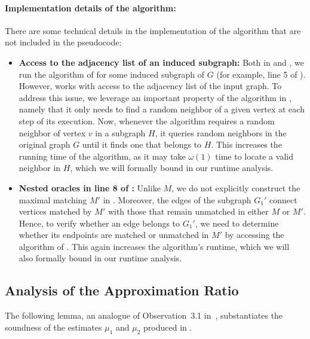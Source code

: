 \documentclass[letterpaper,11pt]{article}
\begin{document}
\paragraph{Implementation details of the algorithm:} There are some technical details in the implementation of the algorithm that are not included in the pseudocode:

\begin{itemize}
    \item \textbf{Access to the adjacency list of an induced subgraph:} Both in  and , we run the algorithm of  for some induced subgraph of $G$ (for example, line 5 of ). However,  works with access to the adjacency list of the input graph. To address this issue, we leverage an important property of the algorithm in , namely that it only needs to find a random neighbor of a given vertex at each step of its execution. Now, whenever the algorithm requires a random neighbor of vertex $v$ in a subgraph $H$, it queries random neighbors in the original graph $G$ until it finds one that belongs to $H$. This increases the running time of the algorithm, as it may take $\omega(1)$ time to locate a valid neighbor in $H$, which we will formally bound in our runtime analysis.

    \item \textbf{Nested oracles in line 8 of :} Unlike $M$, we do not explicitly construct the maximal matching $M'$ in . Moreover, the edges of the subgraph $G_1'$ connect vertices matched by $M'$ with those that remain unmatched in either $M$ or $M'$. Hence, to verify whether an edge belongs to $G_1'$, we need to determine whether its endpoints are matched or unmatched in $M'$ by accessing the algorithm of . This again increases the algorithm's runtime, which we will also formally bound in our runtime analysis.
\end{itemize}










\subsection{Analysis of the Approximation Ratio}

The following lemma,
an analogue of Observation~3.1 in~\cite{BhattacharyaKSW23},
substantiates the soundness of the estimates $\mu_1$ and $\mu_2$ produced in .
\end{document}
